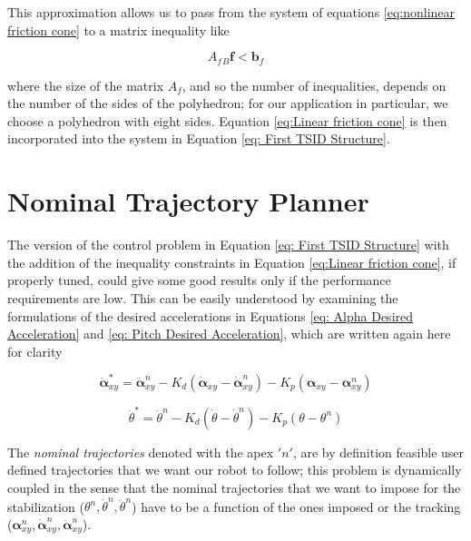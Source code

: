This approximation allows us to pass from the system of equations \eqref{eq:nonlinear friction cone}
to a matrix inequality like

\begin{equation}
    A_{f}{}_{B}\mathbf{f} < \mathbf{b}_{f}
\label{eq:Linear friction cone}
\end{equation}

where the size of the matrix $A_{f}$, and so the number of inequalities, depends on the number of the sides of the polyhedron; for our application in particular, we choose a polyhedron with eight sides.
Equation \eqref{eq:Linear friction cone} is then incorporated into the system in Equation \eqref{eq: First TSID Structure}.

\section{Nominal Trajectory Planner}
\label{sec:Nominal Trajectory Planner}

The version of the control problem in Equation \eqref{eq: First TSID Structure} with the addition of the inequality constraints in Equation \eqref{eq:Linear friction cone}, if properly tuned, could give some good results only if the performance requirements are low. 
This can be easily understood by examining the formulations of the desired accelerations in Equations \eqref{eq: Alpha Desired Acceleration} and \eqref{eq: Pitch Desired Acceleration}, which are written again here for clarity

\begin{equation*}
    \ddot{\bm{\alpha}}_{xy}^{*} = \ddot{\bm{\alpha}}_{xy}^{n} -K_d(\dot{\bm{\alpha}}_{xy}-\dot{\bm{\alpha}}_{xy}^{n}) -K_p(\bm{\alpha}_{xy} - \bm{\alpha}_{xy}^{n})
\end{equation*}

\begin{equation*}
    \ddot{\theta}^{*} = \ddot{\theta}^{n} -K_d(\dot{\theta}-\dot{\theta}^{n}) -K_p(\theta - \theta^{n})
\end{equation*}

The \textit{nominal trajectories} denoted with the apex $'n'$, are by definition feasible user defined trajectories that we want our robot to follow; this problem is dynamically coupled in the sense that the nominal trajectories that we want to impose for the stabilization ($\theta^{n}, \dot{\theta}^{n}, \ddot{\theta}^{n}$) have to be a function of the ones imposed or the tracking ($\bm{\alpha}_{xy}^{n}, \dot{\bm{\alpha}}_{xy}^{n}, \ddot{\bm{\alpha}}_{xy}^{n}$).


